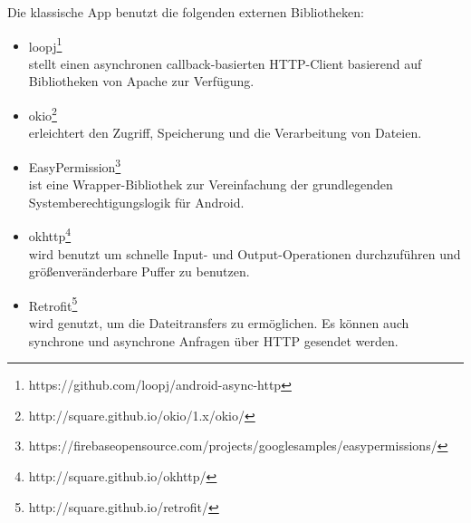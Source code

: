 \noindent Die klassische App benutzt die folgenden externen Bibliotheken:
\begin{itemize}
	\item loopj\footnote{https://github.com/loopj/android-async-http}\\
	stellt einen asynchronen callback-basierten HTTP-Client basierend auf Bibliotheken von Apache zur Verf\"ugung.
	\item okio\footnote{http://square.github.io/okio/1.x/okio/}\\
	erleichtert den Zugriff, Speicherung und die Verarbeitung von Dateien.
	\item EasyPermission\footnote{https://firebaseopensource.com/projects/googlesamples/easypermissions/} \\
	ist eine Wrapper-Bibliothek zur Vereinfachung der grundlegenden Systemberechtigungslogik für Android.
	\item okhttp\footnote{http://square.github.io/okhttp/} \\
	wird benutzt um schnelle Input- und Output-Operationen durchzuf\"uhren und gr\"o\ss{}enver\"anderbare Puffer zu benutzen.
	\item Retrofit\footnote{http://square.github.io/retrofit/} \\
	wird genutzt, um die Dateitransfers zu erm\"oglichen. Es k\"onnen auch synchrone und asynchrone Anfragen \"uber HTTP gesendet werden.
\end{itemize}

